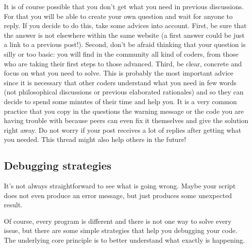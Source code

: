It is of course possible that you don't get what you need in previous discussions. For that you will be able to create your own question and wait for anyone to reply. If you decide to do this, take some advices into account. First, be sure that the answer is not elsewhere within the same website (a first answer could be just a link to a previous post!). Second, don't be afraid thinking that your question is silly or too basic: you will find in the community all kind of coders, from those who are taking their first steps to those advanced. Third, be clear, concrete and focus on what you need to solve. This is probably the most important advice since it is necessary that other coders understand what you need in few words (not philosophical discussions or previous elaborated rationales) and so they can decide to spend some minutes of their time and help you. It is a very common practice that you copy in the questions the warning message or the code you are having trouble with because peers can even fix it themselves and give the solution right away. Do not worry if your post receives a lot of replies after getting what you needed. This thread might also help others in the future!


\subsection{Debugging strategies}

It's not always straightforward to see what is going
wrong. Maybe your script does not even produce an error
message, but just produces some unexpected result.

Of course, every program is different and there is not one
way to solve every issue, but there are some simple strategies
that help you debugging your code. The underlying core
principle is to better understand what exactly is happening.

